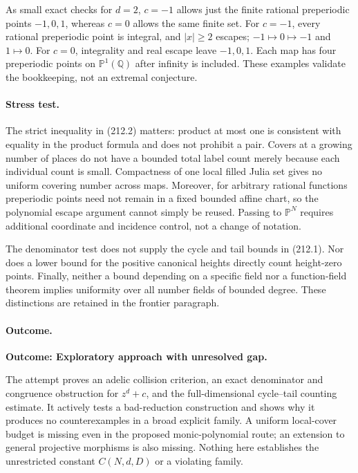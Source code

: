 \documentclass[11pt,a4paper]{article}
\newcommand{\Q}{\mathbb{Q}}
\newcommand{\PP}{\mathbb P}
\begin{document}
As small exact checks for $d=2$, $c=-1$ allows just the finite rational
preperiodic points $-1,0,1$, whereas $c=0$ allows the same finite set. For
$c=-1$, every rational preperiodic point is integral, and $|x|\ge2$ escapes;
$-1\mapsto0\mapsto-1$ and $1\mapsto0$. For $c=0$, integrality and real
escape leave $-1,0,1$. Each map has four preperiodic points on $\PP^1(\Q)$
after infinity is included. These examples validate the bookkeeping, not an
extremal conjecture.

\paragraph{Stress test.}
The strict inequality in (212.2) matters: product at most one is consistent
with equality in the product formula and does not prohibit a pair. Covers
at a growing number of places do not have a bounded total label count
merely because each individual count is small. Compactness of one local
filled Julia set gives no uniform covering number across maps. Moreover,
for arbitrary rational functions preperiodic points need not remain in a
fixed bounded affine chart, so the polynomial escape argument cannot simply
be reused. Passing to $\PP^N$ requires additional coordinate and incidence
control, not a change of notation.

The denominator test does not supply the cycle and tail bounds in (212.1).
Nor does a lower bound for the positive canonical heights directly count
height-zero points. Finally, neither a bound depending on a specific field
nor a function-field theorem implies uniformity over all number fields of
bounded degree. These distinctions are retained in the frontier paragraph.

\paragraph{Outcome.}
\textbf{Outcome: Exploratory approach with unresolved gap.}

The attempt proves an adelic collision criterion, an exact denominator and
congruence obstruction for $z^d+c$, and the full-dimensional cycle--tail
counting estimate. It actively tests a bad-reduction construction and shows
why it produces no counterexamples in a broad explicit family. A uniform
local-cover budget is missing even in the proposed monic-polynomial route;
an extension to general projective morphisms is also missing. Nothing here
establishes the unrestricted constant $C(N,d,D)$ or a violating family.
\end{document}
